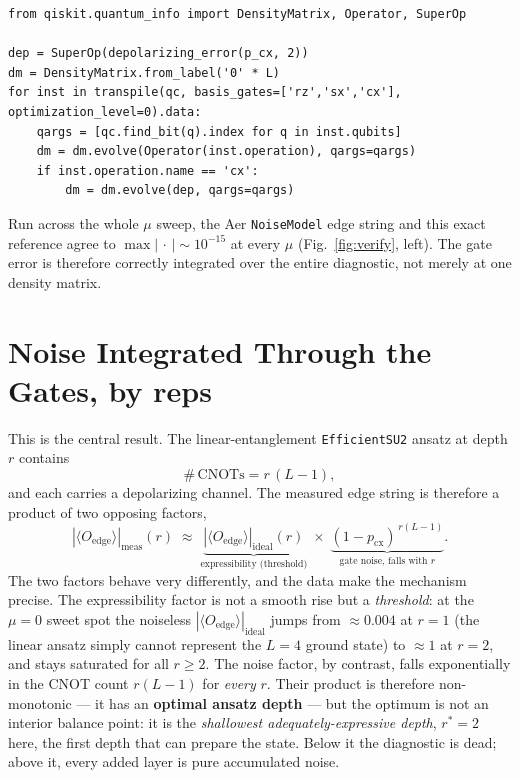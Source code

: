 \documentclass[11pt]{article}
\begin{document}
\begin{verbatim}
from qiskit.quantum_info import DensityMatrix, Operator, SuperOp

dep = SuperOp(depolarizing_error(p_cx, 2))
dm = DensityMatrix.from_label('0' * L)
for inst in transpile(qc, basis_gates=['rz','sx','cx'], optimization_level=0).data:
    qargs = [qc.find_bit(q).index for q in inst.qubits]
    dm = dm.evolve(Operator(inst.operation), qargs=qargs)
    if inst.operation.name == 'cx':
        dm = dm.evolve(dep, qargs=qargs)
\end{verbatim}

Run across the whole $\mu$ sweep, the Aer \texttt{NoiseModel} edge string and this exact reference agree to $\max|\,\cdot\,|\sim10^{-15}$ at every $\mu$ (Fig.~\ref{fig:verify}, left). The gate error is therefore correctly integrated over the entire diagnostic, not merely at one density matrix.

\section{Noise Integrated Through the Gates, by reps}

This is the central result. The linear-entanglement \texttt{EfficientSU2} ansatz at depth $r$ contains
\[
  \#\,\mathrm{CNOTs}=r\,(L-1),
\]
and each carries a depolarizing channel. The measured edge string is therefore a product of two opposing factors,
\begin{equation}
  |\langle O_{\mathrm{edge}}\rangle|_{\mathrm{meas}}(r)
  \;\approx\;
  \underbrace{|\langle O_{\mathrm{edge}}\rangle|_{\mathrm{ideal}}(r)}_{\text{expressibility (threshold)}}
  \;\times\;
  \underbrace{(1-p_{\mathrm{cx}})^{\,r(L-1)}}_{\text{gate noise, falls with }r}.
  \label{eq:tradeoff}
\end{equation}
The two factors behave very differently, and the data make the mechanism precise. The expressibility factor is not a smooth rise but a \emph{threshold}: at the $\mu=0$ sweet spot the noiseless $|\langle O_{\mathrm{edge}}\rangle|_{\mathrm{ideal}}$ jumps from $\approx0.004$ at $r=1$ (the linear ansatz simply cannot represent the $L=4$ ground state) to $\approx1$ at $r=2$, and stays saturated for all $r\ge2$. The noise factor, by contrast, falls exponentially in the CNOT count $r(L-1)$ for \emph{every} $r$. Their product is therefore non-monotonic --- it has an \textbf{optimal ansatz depth} --- but the optimum is not an interior balance point: it is the \emph{shallowest adequately-expressive depth}, $r^\ast=2$ here, the first depth that can prepare the state. Below it the diagnostic is dead; above it, every added layer is pure accumulated noise.
\end{document}
